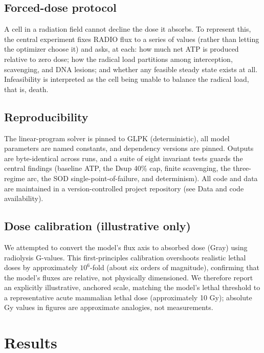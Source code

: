 \documentclass[11pt]{article}
\begin{document}
\subsection{Forced-dose protocol}

A cell in a radiation field cannot decline the dose it absorbs. To represent this,
the central experiment fixes RADIO flux to a series of values (rather than letting
the optimizer choose it) and asks, at each: how much net ATP is produced relative
to zero dose; how the radical load partitions among interception, scavenging, and
DNA lesions; and whether any feasible steady state exists at all. Infeasibility is
interpreted as the cell being unable to balance the radical load, that is, death.

\subsection{Reproducibility}

The linear-program solver is pinned to GLPK (deterministic), all model parameters
are named constants, and dependency versions are pinned. Outputs are byte-identical
across runs, and a suite of eight invariant tests guards the central findings
(baseline ATP, the Dsup 40\% cap, finite scavenging, the three-regime arc, the SOD
single-point-of-failure, and determinism). All code and data are maintained in a
version-controlled project repository (see Data and code availability).

\subsection{Dose calibration (illustrative only)}
\label{sec:calibration}

We attempted to convert the model's flux axis to absorbed dose (Gray) using
radiolysis G-values. This first-principles calibration overshoots realistic lethal
doses by approximately $10^{6}$-fold (about six orders of magnitude), confirming
that the model's fluxes are relative,
not physically dimensioned. We therefore report an explicitly illustrative,
anchored scale, matching the model's lethal threshold to a representative acute
mammalian lethal dose (approximately 10 Gy); absolute Gy values in figures are
approximate analogies, not measurements.

\section{Results}
\end{document}
